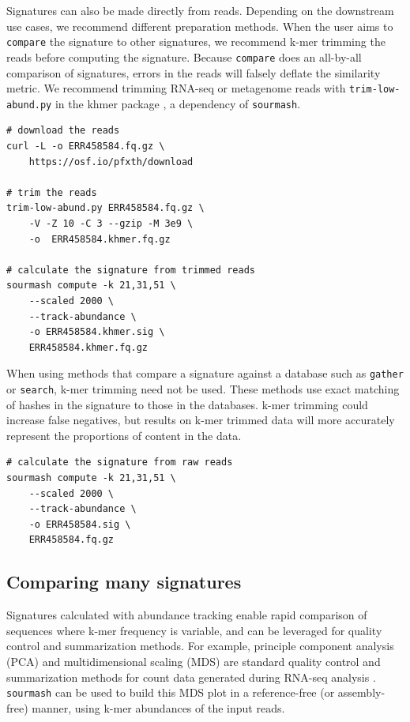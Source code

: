 \documentclass[10pt,a4paper,twocolumn]{article}
\begin{document}
Signatures can also be made directly from reads. Depending on the downstream use cases, we recommend different preparation methods. When the user aims to \lstinline{compare} the signature to other signatures, we recommend k-mer trimming the reads before computing the signature. Because \lstinline{compare} does an all-by-all comparison of signatures, errors in the reads will falsely deflate the similarity metric. We recommend trimming RNA-seq or metagenome reads with \lstinline{trim-low-abund.py} in the khmer package \cite{crusoe2015khmer}, a dependency of \lstinline{sourmash}. 

\begin{lstlisting}
# download the reads
curl -L -o ERR458584.fq.gz \ 
    https://osf.io/pfxth/download

# trim the reads
trim-low-abund.py ERR458584.fq.gz \ 
    -V -Z 10 -C 3 --gzip -M 3e9 \ 
    -o  ERR458584.khmer.fq.gz 

# calculate the signature from trimmed reads
sourmash compute -k 21,31,51 \ 
    --scaled 2000 \ 
    --track-abundance \ 
    -o ERR458584.khmer.sig \ 
    ERR458584.khmer.fq.gz
\end{lstlisting}

When using methods that compare a signature against a database such as \lstinline{gather} or \lstinline{search}, k-mer trimming need not be used. These methods use exact matching of hashes in the signature to those in the databases. k-mer trimming could increase false negatives, but results on k-mer trimmed data will more accurately represent the proportions of content in the data.

\begin{lstlisting}
# calculate the signature from raw reads
sourmash compute -k 21,31,51 \ 
    --scaled 2000 \ 
    --track-abundance \ 
    -o ERR458584.sig \ 
    ERR458584.fq.gz
\end{lstlisting}

\subsection*{Comparing many signatures}

Signatures calculated with abundance tracking enable rapid comparison of sequences where k-mer frequency is variable, and can be leveraged for quality control and summarization methods. For example, principle component analysis (PCA) and multidimensional scaling (MDS) are standard quality control and summarization methods for count data generated during RNA-seq analysis \cite{conesa2016survey}. \lstinline{sourmash} can be used to build this MDS plot in a reference-free (or assembly-free) manner, using k-mer abundances of the input reads.
\end{document}
